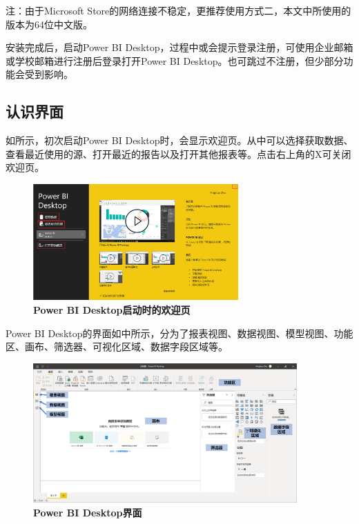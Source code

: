 注：由于Microsoft Store的网络连接不稳定，更推荐使用方式二，本文中所使用的版本为64位中文版。

安装完成后，启动Power BI Desktop，过程中或会提示登录注册，可使用企业邮箱或学校邮箱进行注册后登录打开Power BI Desktop。也可跳过不注册，但少部分功能会受到影响。

\subsection{认识界面}

如所示，初次启动Power BI Desktop时，会显示欢迎页。从中可以选择获取数据、查看最近使用的源、打开最近的报告以及打开其他报表等。点击右上角的X可关闭欢迎页。

\begin{figure}[htbp]
    \centering
    \includegraphics[width=0.7\textwidth]{figure/PowerBI/powerbi_welcome_page.png}
    \caption{\textbf{Power BI Desktop启动时的欢迎页}}
    \label{fig:powerbi_welcome_page}
\end{figure}

Power BI Desktop的界面如中所示，分为了报表视图、数据视图、模型视图、功能区、画布、筛选器、可视化区域、数据字段区域等。

\begin{figure}[htbp]
    \centering
    \includegraphics[width=0.9\textwidth]{figure/PowerBI/powerbi_ui.png}
    \caption{\textbf{Power BI Desktop界面}}
    \label{fig:powerbi_ui}
\end{figure}


